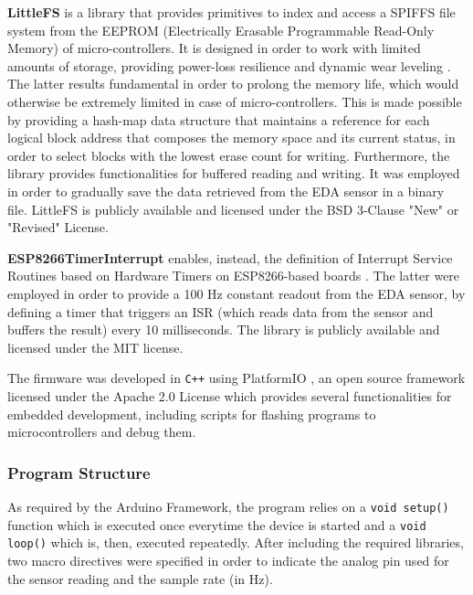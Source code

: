 \textbf{LittleFS} is a library that provides primitives to index and access a SPIFFS file system from the EEPROM (Electrically Erasable Programmable Read-Only Memory) of micro-controllers. It is designed in order to work with limited amounts of storage, providing power-loss resilience and dynamic wear leveling \cite{littlefs}. The latter results fundamental in order to prolong the memory life, which would otherwise be extremely limited in case of micro-controllers. This is made possible by providing a hash-map data structure that maintains a reference for each logical block address that composes the memory space and its current status, in order to select blocks with the lowest erase count for writing. Furthermore, the library provides functionalities for buffered reading and writing. It was employed in order to gradually save the data retrieved from the EDA sensor in a binary file.
LittleFS is publicly available and licensed under the BSD 3-Clause "New" or "Revised" License.

\vspace{8mm}

\textbf{ESP8266TimerInterrupt} enables, instead, the definition of Interrupt Service Routines based on Hardware Timers on ESP8266-based boards \cite{esp8266timerinterrupt}. The latter were employed in order to provide a 100 Hz constant readout from the EDA sensor, by defining a timer that triggers an ISR (which reads data from the sensor and buffers the result) every 10 milliseconds. The library is publicly available and licensed under the MIT license.

\vspace{8mm}

The firmware was developed in \texttt{C++} using PlatformIO \cite{platformio}, an open source framework licensed under the Apache 2.0 License which provides several functionalities for embedded development, including scripts for flashing programs to microcontrollers and debug them.

\subsubsection{Program Structure}\label{subsubsec:program-structure}

As required by the Arduino Framework, the program relies on a \texttt{void setup()} function which is executed once everytime the device is started and a \texttt{void loop()} which is, then, executed repeatedly. After including the required libraries, two macro directives were specified in order to indicate the analog pin used for the sensor reading and the sample rate (in Hz).

